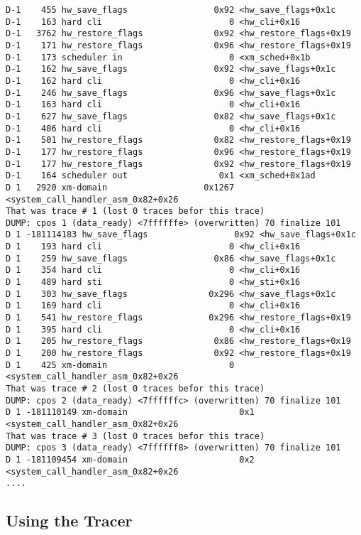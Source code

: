 \begin{verbatim}
D-1    455 hw_save_flags                 0x92 <hw_save_flags+0x1c 
D-1    163 hard cli                         0 <hw_cli+0x16 
D-1   3762 hw_restore_flags              0x92 <hw_restore_flags+0x19 
D-1    171 hw_restore_flags              0x96 <hw_restore_flags+0x19 
D-1    173 scheduler in                     0 <xm_sched+0x1b 
D-1    162 hw_save_flags                 0x92 <hw_save_flags+0x1c 
D-1    162 hard cli                         0 <hw_cli+0x16 
D-1    246 hw_save_flags                 0x96 <hw_save_flags+0x1c 
D-1    163 hard cli                         0 <hw_cli+0x16 
D-1    627 hw_save_flags                 0x82 <hw_save_flags+0x1c 
D-1    406 hard cli                         0 <hw_cli+0x16 
D-1    501 hw_restore_flags              0x82 <hw_restore_flags+0x19 
D-1    177 hw_restore_flags              0x96 <hw_restore_flags+0x19 
D-1    177 hw_restore_flags              0x92 <hw_restore_flags+0x19 
D-1    164 scheduler out                  0x1 <xm_sched+0x1ad 
D 1   2920 xm-domain                   0x1267 <system_call_handler_asm_0x82+0x26 
That was trace # 1 (lost 0 traces befor this trace)
DUMP: cpos 1 (data_ready) <7ffffffe> (overwritten) 70 finalize 101
D 1 -181114183 hw_save_flags                 0x92 <hw_save_flags+0x1c 
D 1    193 hard cli                         0 <hw_cli+0x16 
D 1    259 hw_save_flags                 0x86 <hw_save_flags+0x1c 
D 1    354 hard cli                         0 <hw_cli+0x16 
D 1    489 hard sti                         0 <hw_sti+0x16 
D 1    303 hw_save_flags                0x296 <hw_save_flags+0x1c 
D 1    169 hard cli                         0 <hw_cli+0x16 
D 1    541 hw_restore_flags             0x296 <hw_restore_flags+0x19 
D 1    395 hard cli                         0 <hw_cli+0x16 
D 1    205 hw_restore_flags              0x86 <hw_restore_flags+0x19 
D 1    200 hw_restore_flags              0x92 <hw_restore_flags+0x19 
D 1    425 xm-domain                        0 <system_call_handler_asm_0x82+0x26 
That was trace # 2 (lost 0 traces befor this trace)
DUMP: cpos 2 (data_ready) <7ffffffc> (overwritten) 70 finalize 101
D 1 -181110149 xm-domain                      0x1 <system_call_handler_asm_0x82+0x26 
That was trace # 3 (lost 0 traces befor this trace)
DUMP: cpos 3 (data_ready) <7ffffff8> (overwritten) 70 finalize 101
D 1 -181109454 xm-domain                      0x2 <system_call_handler_asm_0x82+0x26 
....
\end{verbatim}


\subsection{Using the Tracer}


